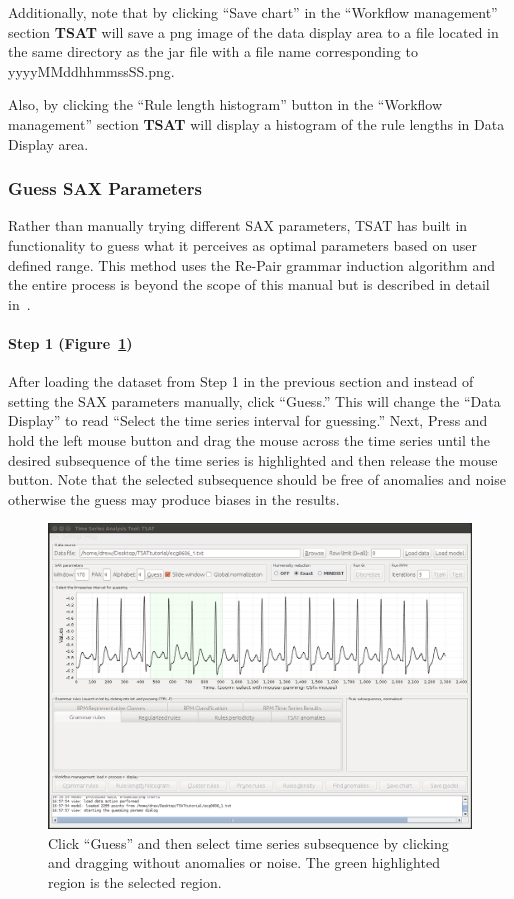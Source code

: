 \documentclass[titlepage, letterpaper, 12pt]{article}
\newcommand\TSAT{\textbf{TSAT}}
\begin{document}
Additionally, note that by clicking ``Save chart'' in the ``Workflow management'' section {\TSAT} will save a png image of the data display area to a file located in the same directory as the jar file with a file name corresponding to yyyyMMddhhmmssSS.png.

Also, by clicking the ``Rule length histogram'' button in the ``Workflow management'' section {\TSAT} will display a histogram of the rule lengths in Data Display area.



\subsubsection{Guess SAX Parameters}

Rather than manually trying different SAX parameters, TSAT has built in functionality to guess what it perceives as optimal parameters based on user defined range.  This method uses the Re-Pair grammar induction algorithm and the entire process is beyond the scope of this manual but is described in detail in~\cite{paramSelection}.

\paragraph{Step 1 (Figure~\ref{fig:step1-guess})} After loading the dataset from Step 1 in the previous section and instead of setting the SAX parameters manually, click ``Guess.''  This will change the ``Data Display'' to read ``Select the time series interval for guessing.'' Next, Press and hold the left mouse button and drag the mouse across the time series until the desired subsequence of the time series is highlighted and then release the mouse button.  Note that the selected subsequence should be free of anomalies and noise otherwise the guess may produce biases in the results.

\begin{figure}[H]
	\centering
	\includegraphics[width=\textwidth]{pictures/motifguide/step1-guess}
	\caption{Click ``Guess'' and then select time series subsequence by clicking and dragging without anomalies or noise.  The green highlighted region is the selected region. }
	\label{fig:step1-guess}
\end{figure}
\end{document}
